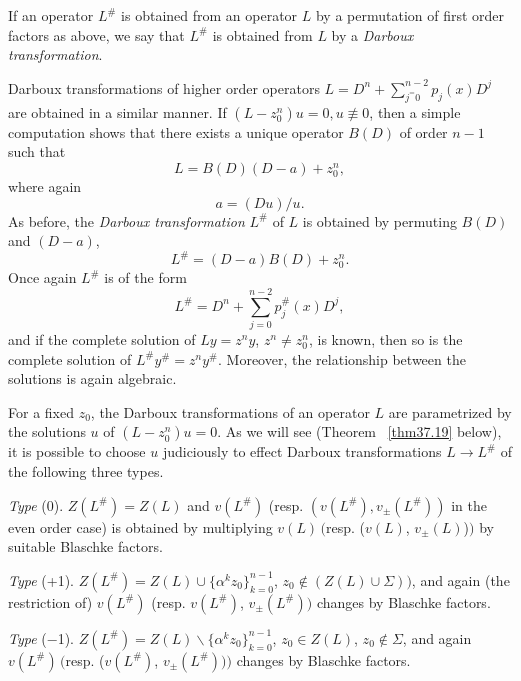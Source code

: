 \documentclass{surv-l}
\theoremstyle{plain}
\theoremstyle{definition}
\numberwithin{equation}{chapter}
\begin{document}
If an operator $L^{\#}$ is obtained from an operator $L$ by a permutation of first order factors as above, we say that $L^{\#}$ is obtained from $L$ by a \emph{Darboux transformation}.


Darboux transformations of higher order operators $L=D^{n}+\sum_{j^=0}^{n-2}p_{j}(x)D^{j}$ are obtained in a similar manner. If $(L-z_{0}^{n})u=0,u\not\equiv 0$, then a simple computation shows that there exists a unique operator $B(D)$ of order $n-1$ such that
\begin{equation}\label{eq37.13}
L=B(D)(D-a)+z_{0}^{n},
\end{equation}
where again
\setcounter{equation}{6}
\begin{equation}
a=(Du)/u.
\end{equation}
As before, the \emph{Darboux transformation} $L^{\#}$ of $L$ is obtained by permuting $B(D)$ and $(D-a)$,
\setcounter{equation}{13}
\begin{equation}\label{eq37.14}
L^{\#}=(D-a)B(D)+z_{0}^{n}.
\end{equation}
Once again $L^{\#}$ is of the form
\begin{equation}\label{eq37.15}
L^{\#}=D^{n}+\sum_{j=0}^{n-2}p_{j}^{\#}(x)D^{j},
\end{equation}
and if the complete solution of $Ly=z^{n}y$, $z^{n}\neq z_{0}^{n}$, is known, then so is the complete solution of $L^{\#} y^{\#}=z^{n}y^{\#}$. Moreover, the relationship between the solutions is again algebraic.

For a fixed $z_{0}$, the Darboux transformations of an operator $L$ are parametrized by the solutions $u$ of $(L-z_{0}^{n})u=0$. As we will see (Theorem ~\ref{thm37.19} below), it is possible to choose $u$ judiciously to effect Darboux transformations $L\rightarrow L^{\#}$ of the following three types.

\emph{Type} (0). $Z(L^{\#})=Z(L)$ and $v(L^{\#})$ (resp. $(v(L^{\#}), v_{\pm}(L^{\#}))$ in the even order case) is obtained by multiplying $v(L)\,($resp. ($v(L)$, $v_{\pm}(L)$)$)$ by suitable Blaschke factors.

\emph{Type} (+1). $Z(L^{\#})=Z(L)\cup\{\alpha^{k}z_{0}\}_{k=0}^{n-1}$, $z_{0}\not\in(Z(L)\cup\Sigma))$, and again (the restriction of) $v(L^{\#})$ (resp. $v(L^{\#})$, $v_{\pm}(L^{\#}))$ changes by Blaschke factors.

\emph{Type} ($-$1). $Z(L^{\#})=Z(L)\backslash \{\alpha^{k}z_{0}\}_{k=0}^{n-1}$, $z_{0}\in Z(L)$, $z_{0}\not\in\Sigma$, and again $v(L^{\#})\,($resp. ($v(L^{\#})$, $v_{\pm}(L^{\#})))$ changes by Blaschke factors.
\end{document}
